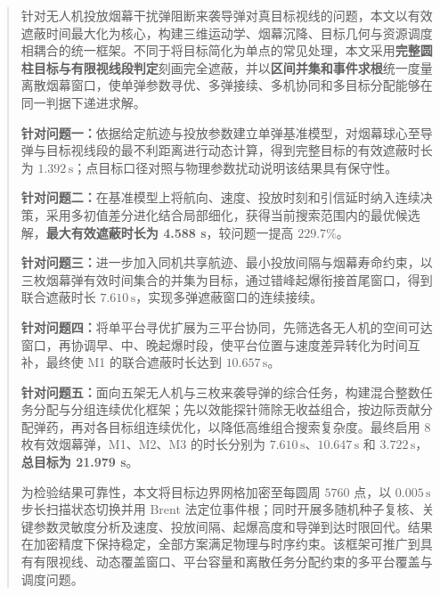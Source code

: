 \begin{abstract}
针对无人机投放烟幕干扰弹阻断来袭导弹对真目标视线的问题，本文以有效遮蔽时间最大化为核心，构建三维运动学、烟幕沉降、目标几何与资源调度相耦合的统一框架。不同于将目标简化为单点的常见处理，本文采用\textbf{完整圆柱目标与有限视线段判定}刻画完全遮蔽，并以\textbf{区间并集和事件求根}统一度量离散烟幕窗口，使单弹参数寻优、多弹接续、多机协同和多目标分配能够在同一判据下递进求解。

\textbf{针对问题一：}依据给定航迹与投放参数建立单弹基准模型，对烟幕球心至导弹与目标视线段的最不利距离进行动态计算，得到完整目标的有效遮蔽时长为 $1.392\,\mathrm{s}$；点目标口径对照与物理参数扰动说明该结果具有保守性。

\textbf{针对问题二：}在基准模型上将航向、速度、投放时刻和引信延时纳入连续决策，采用多初值差分进化结合局部细化，获得当前搜索范围内的最优候选解，\textbf{最大有效遮蔽时长为 4.588 s}，较问题一提高 $229.7\%$。

\textbf{针对问题三：}进一步加入同机共享航迹、最小投放间隔与烟幕寿命约束，以三枚烟幕弹有效时间集合的并集为目标，通过错峰起爆衔接首尾窗口，得到联合遮蔽时长 $7.610\,\mathrm{s}$，实现多弹遮蔽窗口的连续接续。

\textbf{针对问题四：}将单平台寻优扩展为三平台协同，先筛选各无人机的空间可达窗口，再协调早、中、晚起爆时段，使平台位置与速度差异转化为时间互补，最终使 M1 的联合遮蔽时长达到 $10.657\,\mathrm{s}$。

\textbf{针对问题五：}面向五架无人机与三枚来袭导弹的综合任务，构建混合整数任务分配与分组连续优化框架；先以效能探针筛除无收益组合，按边际贡献分配弹药，再对各目标组连续优化，以降低高维组合搜索复杂度。最终启用 $8$ 枚有效烟幕弹，M1、M2、M3 的时长分别为 $7.610\,\mathrm{s}$、$10.647\,\mathrm{s}$ 和 $3.722\,\mathrm{s}$，\textbf{总目标为 21.979 s}。

为检验结果可靠性，本文将目标边界网格加密至每圆周 $5760$ 点，以 $0.005\,\mathrm{s}$ 步长扫描状态切换并用 Brent 法定位事件根；同时开展多随机种子复核、关键参数灵敏度分析及速度、投放间隔、起爆高度和导弹到达时限回代。结果在加密精度下保持稳定，全部方案满足物理与时序约束。该框架可推广到具有有限视线、动态覆盖窗口、平台容量和离散任务分配约束的多平台覆盖与调度问题。

\end{abstract}
\endinput
